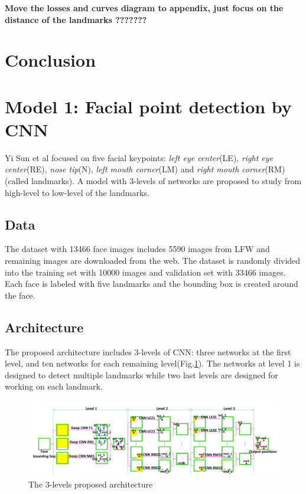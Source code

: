\textbf{Move the losses and curves diagram to appendix, just focus on the distance of the landmarks ???????}
\section{Conclusion}


\iffalse

\section{Model 1: Facial point detection by CNN}
Yi Sun et al\cite{sun2013deep} focused on five facial keypoints: \textit{left eye center}(LE), \textit{right eye center}(RE), \textit{nose tip}(N), \textit{left mouth corner}(LM) and \textit{right mouth corner}(RM) (called landmarks). A model with 3-levels of networks are proposed to study from high-level to low-level of the landmarks.
\subsection{Data}
The dataset with 13466 face images includes 5590 images from LFW \cite{huang2007labeled} and remaining images are downloaded from the web. The dataset is randomly divided into the training set with 10000 images and validation set with 33466 images. Each face is labeled with five landmarks and the bounding box is created around the face.
\subsection{Architecture}
The proposed architecture includes 3-levels of CNN: three networks at the first level, and ten networks for each remaining level(Fig.\ref{3levels}). The networks at level 1 is designed to detect multiple landmarks while two last levels are designed for working on each landmark.
\begin{figure}[h]
	\centering
	\includegraphics[scale=0.35]{images/3levels}
	\caption{The 3-levels proposed architecture}
	\label{3levels}
\end{figure}

